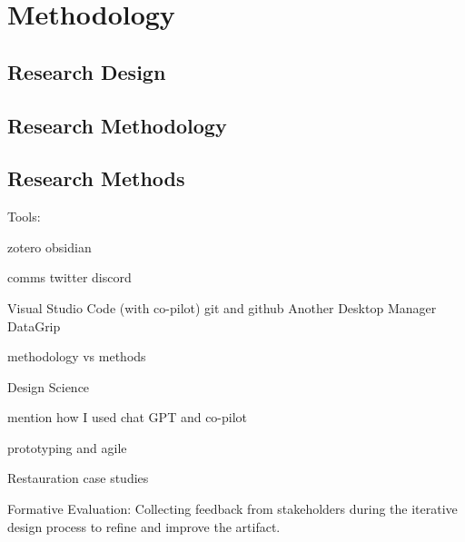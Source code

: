 \chapter{Methodology}



\section{Research Design}


\section{Research Methodology}


\section{Research Methods}


Tools:

zotero
obsidian


comms
twitter
discord


Visual Studio Code (with co-pilot)
git and github
Another Desktop Manager
DataGrip


methodology vs methods


Design Science 

mention how I used chat GPT and co-pilot

prototyping and agile


Restauration case studies




Formative Evaluation: Collecting feedback from stakeholders during the iterative design process to refine and improve the artifact.